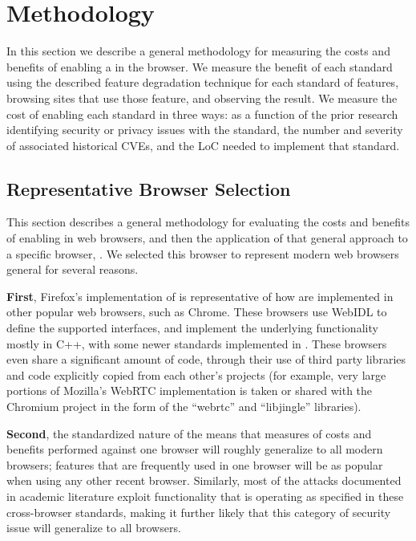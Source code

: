 \section{Methodology}
\label{cost-benefit:methodology}

In this section we describe a general methodology for measuring the costs and
benefits of enabling a \WAS in the browser.  We measure the benefit of each
standard using the described feature degradation technique for each standard of features, browsing
sites that use those feature, and observing the result.  We
measure the cost of enabling each standard in three ways: as a function of
the prior research identifying security or privacy issues with the
standard, the number and severity of associated historical CVEs, and the LoC
needed to implement that standard.

\subsection{Representative Browser Selection}
\label{cost-benefit:methodology:methodology-browser}
This section describes a general methodology for evaluating the costs and
benefits of enabling \WASs in web browsers, and then the application of that
general approach to a specific browser, \textbf{\FFWithVersion}.  We selected
this browser to represent modern web browsers general for several reasons.

\textbf{First}, Firefox's implementation of \WASs is representative of how \WASs
are implemented in other popular web browsers, such as Chrome.  These browsers
use WebIDL to define the supported \WA interfaces, and implement the underlying functionality
mostly in C++, with some newer standards implemented in \JS.  These browsers even
share a significant amount of code, through their use
of third party libraries and code explicitly copied from each other's projects
(for example, very large portions of Mozilla's WebRTC implementation is taken or
shared with the Chromium project in the form of the ``webrtc'' and ``libjingle''
libraries).


\textbf{Second}, the standardized nature of the \WA means that measures of
\WA costs and benefits performed against one browser will roughly generalize to
all modern browsers; features that are frequently used in one browser will be
as popular when using any other recent browser.
Similarly, most of the attacks documented in academic literature exploit
functionality that is operating as specified in these cross-browser standards,
making it further likely that this category of security issue will generalize
to all browsers.

